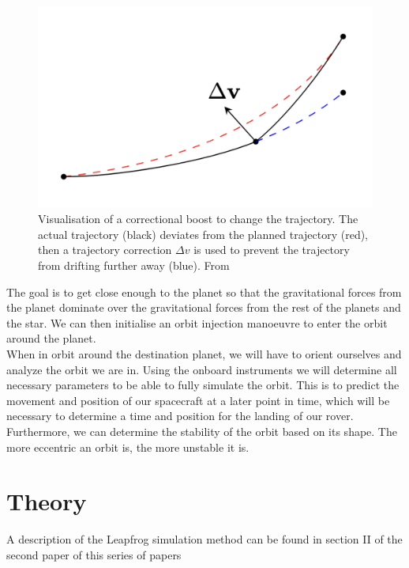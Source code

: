 \documentclass[reprint,english,notitlepage]{revtex4-2}
\begin{document}
\begin{figure}[h]
    \centering
    \includegraphics[scale=0.12]{Figures/boost_fig}
    \caption{Visualisation of a correctional boost to change the trajectory. The actual trajectory (black) deviates from the planned trajectory (red), then a trajectory
        correction $\Delta v$ is used to prevent the trajectory from drifting further away (blue). From %
    }\label{fig:boost_fig}
\end{figure}

The goal is to get close enough to the planet so that the gravitational forces from the planet dominate over the gravitational forces from the rest of the planets and the star.
We can then initialise an orbit injection manoeuvre to enter the orbit around the planet.\\

When in orbit around the destination planet, we will have to orient ourselves and analyze the orbit we are in.
Using the onboard instruments we will determine all necessary parameters to be able to fully simulate the orbit.
This is to predict the movement and position of our spacecraft at a later point in time, which will be necessary to determine a time and position for the landing of our rover.
Furthermore, we can determine the stability of the orbit based on its shape.
The more eccentric an orbit is, the more unstable it is.



\section{Theory} \label{sec: theory}
A description of the Leapfrog simulation method can be found in section II of the second paper %
of this series of papers
\end{document}
